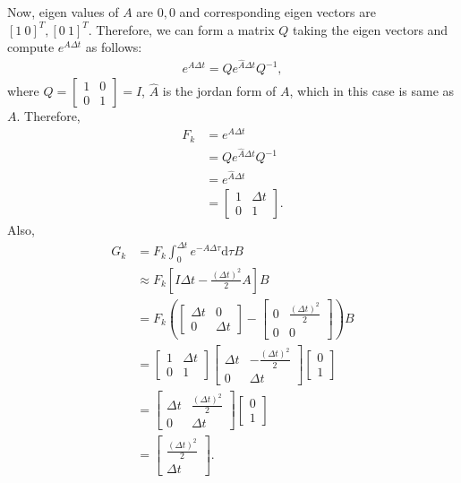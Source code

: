 Now, eigen values of $A$ are $0,0$ and corresponding eigen vectors are $[1\ 0]^T, [0\ 1]^T$. Therefore, we can form a matrix $Q$ taking the eigen vectors and compute $e^{A\Delta t}$ as follows:
\begin{align*}
	e^{A\Delta t} = Q e^{\hat{A}\Delta t} Q^{-1},
\end{align*}
where $Q = \begin{bmatrix}1 & 0\\0 & 1\end{bmatrix}=I$, $\hat{A}$ is the jordan form of $A$, which in this case is same as $A$. Therefore,
\begin{align*}
	F_k &= e^{A\Delta t}\\
	&= Q e^{\hat{A}\Delta t}Q^{-1}\\
	&= e^{\hat{A}\Delta t}\\
	&= \begin{bmatrix}1&\Delta t\\0&1\end{bmatrix}.
\end{align*}
Also,
\begin{align*}
	G_k &= F_k \int_{0}^{\Delta t}e^{-A\Delta \tau}\text{d}\tau B\\
	&\approx F_k\left[I\Delta t - \frac{(\Delta t)^2}{2}A\right]B\\
	&= F_k \left(\begin{bmatrix}\Delta t & 0\\0 & \Delta t\end{bmatrix}-\begin{bmatrix}0&\frac{(\Delta t)^2}{2}\\0&0\end{bmatrix}\right)B\\
	&= \begin{bmatrix}1&\Delta t\\0&1\end{bmatrix}\begin{bmatrix}\Delta t&-\frac{(\Delta t)^2}{2}\\0&\Delta t\end{bmatrix}\begin{bmatrix}0\\1\end{bmatrix}\\
	&= \begin{bmatrix}\Delta t&\frac{(\Delta t)^2}{2}\\0&\Delta t\end{bmatrix}\begin{bmatrix}0\\1\end{bmatrix}\\
	&= \begin{bmatrix}\frac{(\Delta t)^2}{2}\\ \Delta t\end{bmatrix}.
\end{align*}
